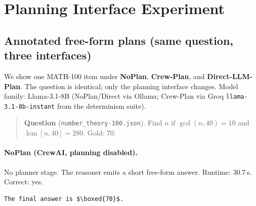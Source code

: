 \section{Planning Interface Experiment}
\label{app:planning-interface}

\subsection{Annotated free-form plans (same question, three interfaces)}
\label{app:annotated-plans}
We show one MATH-100 item under \textbf{NoPlan}, \textbf{Crew-Plan}, and \textbf{Direct-LLM-Plan}.
The question is identical; only the planning interface changes.
Model family: Llama-3.1-8B (NoPlan/Direct via Ollama; Crew-Plan via Groq \texttt{llama-3.1-8b-instant} from the determinism suite).

\begin{quote}
\small
\textbf{Question} (\texttt{number\_theory-100.json}).
Find $n$ if $\gcd(n,40)=10$ and $\mathop{\mathrm{lcm}}[n,40]=280$.
\quad Gold: $70$.
\end{quote}

\paragraph{NoPlan (CrewAI, planning disabled).}
No planner stage. The reasoner emits a short free-form answer.
Runtime: $30.7$\,s. Correct: yes.
\begin{verbatim}
The final answer is $\boxed{70}$.
\end{verbatim}

